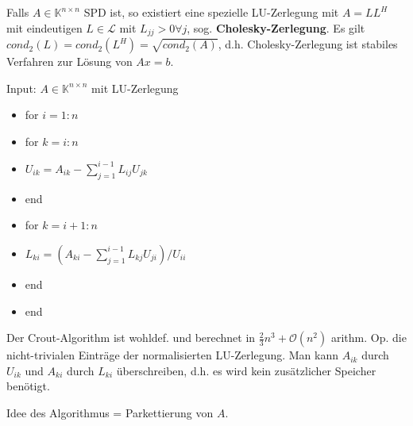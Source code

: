 \begin{remark}
	Falls $A \in \mathbb{K}^{n\times n}$ SPD ist, so existiert eine spezielle LU-Zerlegung mit $A=LL^H$ mit eindeutigen $L \in \mathcal{L}$ mit $L_{jj} > 0 \forall j$, sog. \textbf{Cholesky-Zerlegung}. Es gilt $cond_2(L) = cond_2(L^H) = \sqrt{cond_2(A)}$, d.h. Cholesky-Zerlegung ist stabiles Verfahren zur Lösung von $Ax=b$.
\end{remark}

\begin{algorithm}[Crout]
	Input: $A \in \mathbb{K}^{n\times n}$ mit LU-Zerlegung
	
	\begin{itemize}
		\item for $i=1:n$
		\item \hspace{0.5cm} for $k=i:n$
		\item \hspace{1cm} $U_{ik} = A_{ik} - \sum_{j=1}^{i-1} L_{ij}U_{jk}$
		\item \hspace{0.5cm} end
		\item \hspace{0.5cm} for $k = i+1:n$
		\item \hspace{1cm} $L_{ki} = \left(A_{ki} - \sum_{j=1}^{i-1} L_{kj} U_{ji}\right)/U_{ii}$
		\item \hspace{0.5cm} end
		\item end
	\end{itemize}
\end{algorithm}

\begin{theorem}
	Der Crout-Algorithm ist wohldef. und berechnet in $\frac{2}{3}n^3 + \mathcal{O}(n^2)$ arithm. Op. die nicht-trivialen Einträge der normalisierten LU-Zerlegung. Man kann $A_{ik}$ durch $U_{ik}$ und $A_{ki}$ durch $L_{ki}$ überschreiben, d.h. es wird kein zusätzlicher Speicher benötigt.
\end{theorem}

Idee des Algorithmus = Parkettierung von $A$.

